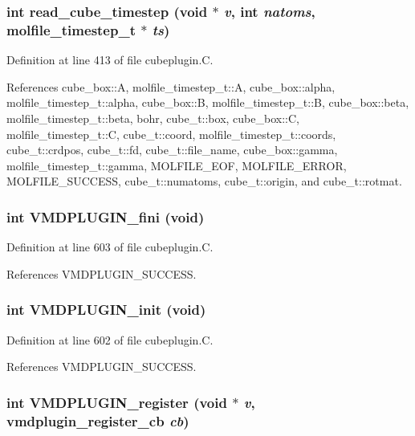 \subsubsection{\setlength{\rightskip}{0pt plus 5cm}int read\_\-cube\_\-timestep (void $\ast$ {\em v}, int {\em natoms}, {\bf molfile\_\-timestep\_\-t} $\ast$ {\em ts})\hspace{0.3cm}{\tt  [static]}}\label{cubeplugin_8C_a9}




Definition at line 413 of file cubeplugin.C.

References cube\_\-box::A, molfile\_\-timestep\_\-t::A, cube\_\-box::alpha, molfile\_\-timestep\_\-t::alpha, cube\_\-box::B, molfile\_\-timestep\_\-t::B, cube\_\-box::beta, molfile\_\-timestep\_\-t::beta, bohr, cube\_\-t::box, cube\_\-box::C, molfile\_\-timestep\_\-t::C, cube\_\-t::coord, molfile\_\-timestep\_\-t::coords, cube\_\-t::crdpos, cube\_\-t::fd, cube\_\-t::file\_\-name, cube\_\-box::gamma, molfile\_\-timestep\_\-t::gamma, MOLFILE\_\-EOF, MOLFILE\_\-ERROR, MOLFILE\_\-SUCCESS, cube\_\-t::numatoms, cube\_\-t::origin, and cube\_\-t::rotmat.
\subsubsection{\setlength{\rightskip}{0pt plus 5cm}int VMDPLUGIN\_\-fini (void)}\label{cubeplugin_8C_a13}




Definition at line 603 of file cubeplugin.C.

References VMDPLUGIN\_\-SUCCESS.
\subsubsection{\setlength{\rightskip}{0pt plus 5cm}int VMDPLUGIN\_\-init (void)}\label{cubeplugin_8C_a12}




Definition at line 602 of file cubeplugin.C.

References VMDPLUGIN\_\-SUCCESS.
\subsubsection{\setlength{\rightskip}{0pt plus 5cm}int VMDPLUGIN\_\-register (void $\ast$ {\em v}, {\bf vmdplugin\_\-register\_\-cb} {\em cb})}\label{cubeplugin_8C_a14}




